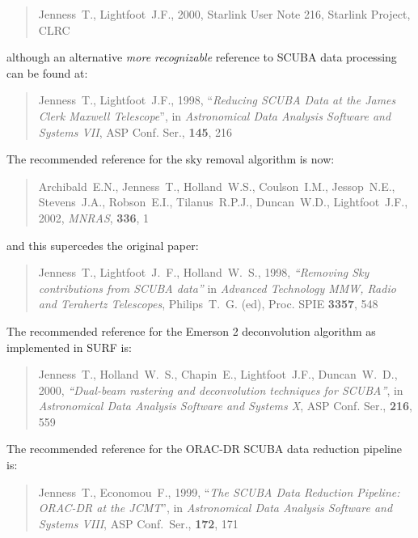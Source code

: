 \documentclass[twoside,11pt]{article}
\renewcommand{\_}{\texttt{\symbol{95}}}
\begin{document}
\begin{quote}
Jenness~T., Lightfoot~J.F., 2000, Starlink User Note 216, Starlink
Project, CLRC
\end{quote}

although an alternative \textit{more recognizable} reference to SCUBA data processing
can be found at:

\begin{quote}
Jenness~T., Lightfoot~J.F., 1998, ``\textit{Reducing SCUBA Data at the James
  Clerk Maxwell Telescope}'', in
\textit{Astronomical Data Analysis Software and Systems VII}, ASP Conf. Ser.,
\textbf{145}, 216
\end{quote}

The recommended reference for the sky removal algorithm is now:

\begin{quote}
Archibald~E.N., Jenness~T., Holland~W.S., Coulson~I.M., Jessop~N.E.,
Stevens~J.A., Robson~E.I., Tilanus~R.P.J., Duncan~W.D., Lightfoot~J.F., 2002,
\textit{MNRAS}, \textbf{336}, 1 
\end{quote}

and this supercedes the original paper:

\begin{quote}
Jenness~T., Lightfoot~J.~F., Holland~W.~S., 1998, 
\textit{``Removing Sky contributions from SCUBA data''} in \textit{Advanced
Technology MMW, Radio and Terahertz Telescopes}, Philips~T.~G. (ed),
Proc. SPIE \textbf{3357}, 548
\end{quote}

The recommended reference for the Emerson 2 deconvolution algorithm
as implemented in SURF is:

\begin{quote}
Jenness~T., Holland~W.~S., Chapin~E., Lightfoot~J.F., Duncan~W.~D., 2000,
\textit{``Dual-beam rastering and deconvolution techniques for SCUBA''}, in
\textit{Astronomical Data Analysis Software and Systems X}, ASP Conf. Ser.,
\textbf{216}, 559
\end{quote}

The recommended reference for the ORAC-DR SCUBA data reduction pipeline is:

\begin{quote}
Jenness~T., Economou~F.,  1999, ``\textit{The SCUBA Data Reduction Pipeline:
ORAC-DR at the JCMT}'', in \textit{Astronomical Data Analysis Software and
Systems VIII}, ASP Conf.\ Ser., \textbf{172}, 171
\end{quote}
\end{document}
